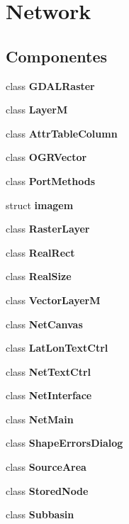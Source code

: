 \section{Network}
\label{group___network}
\subsection*{Componentes}
\begin{DoxyCompactItemize}
\item 
class {\bf G\+D\+A\+L\+Raster}
\item 
class {\bf LayerM}
\item 
class {\bf Attr\+Table\+Column}
\item 
class {\bf O\+G\+R\+Vector}
\item 
class {\bf Port\+Methods}
\item 
struct {\bf imagem}
\item 
class {\bf Raster\+Layer}
\item 
class {\bf Real\+Rect}
\item 
class {\bf Real\+Size}
\item 
class {\bf Vector\+LayerM}
\item 
class {\bf Net\+Canvas}
\item 
class {\bf Lat\+Lon\+Text\+Ctrl}
\item 
class {\bf Net\+Text\+Ctrl}
\item 
class {\bf Net\+Interface}
\item 
class {\bf Net\+Main}
\item 
class {\bf Shape\+Errors\+Dialog}
\item 
class {\bf Source\+Area}
\item 
class {\bf Stored\+Node}
\item 
class {\bf Subbasin}
\end{DoxyCompactItemize}
